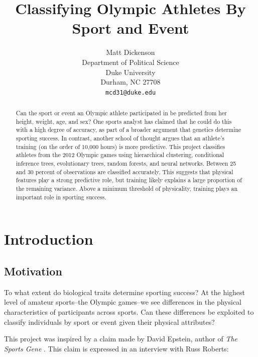 \documentclass[12pt,letterpaper]{article} %
\title{Classifying Olympic Athletes By Sport and Event}
\author{
Matt Dickenson\\
Department of Political Science\\
Duke University\\
Durham, NC 27708 \\
\texttt{mcd31@duke.edu}
}
\begin{document}
\begin{titlepage}

\clearpage
\maketitle
\thispagestyle{empty}

\begin{abstract}
Can the sport or event an Olympic athlete participated in be predicted from her height, weight, age, and sex? One sports analyst has claimed that he could do this with a high degree of accuracy, as part of a broader argument that genetics determine sporting success. In contrast, another school of thought argues that an athlete's training (on the order of 10,000 hours) is more predictive. This project classifies athletes from the 2012 Olympic games using hierarchical clustering, conditional inference trees, evolutionary trees, random forests, and neural networks. Between 25 and 30 percent of observations are classified accurately. This suggests that physical features play a strong predictive role, but training likely explains a large proportion of the remaining variance. Above a minimum threshold of physicality, training plays an important role in sporting success.
\end{abstract}

\end{titlepage}



\newpage

\section{Introduction}

\subsection{Motivation}

To what extent do biological traits determine sporting success? At the highest level of amateur sports--the Olympic games--we see differences in the physical characteristics of participants across sports. Can these differences be exploited to classify individuals by sport or event given their physical attributes? 

This project was inspired by a claim made by David Epstein, author of \textit{The Sports Gene} \citep{epstein2013sports}. This claim is expressed in an interview with Russ Roberts:
\end{document}
